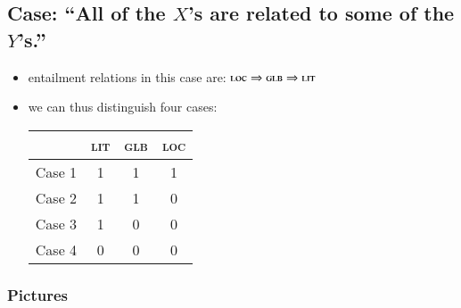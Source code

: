 \documentclass[fleqn,reqno,10pt,draft]{article}
\newcommand{\lit}{\ensuremath{\text{\textsc{lit}}}}
\newcommand{\glb}{\ensuremath{\text{\textsc{glb}}}}
\newcommand{\loc}{\ensuremath{\text{\textsc{loc}}}}
\begin{document}
\subsection{Case: ``All of the $X$'s are related to some of the $Y$'s.''}
\label{sec:case:-all-some}

\begin{itemize}
\item entailment relations in this case are: $\loc
  \Rightarrow \glb \Rightarrow \lit$
\item we can thus distinguish four cases:
  \begin{center}
    \begin{tabular}{lccc}
      \toprule
      & \textsc{lit} & \textsc{glb} & \textsc{loc} \\ \midrule
      Case 1 & 1 & 1 & 1 \\
      Case 2 & 1 & 1 & 0 \\
      Case 3 & 1 & 0 & 0 \\
      Case 4 & 0 & 0 & 0 \\ \bottomrule
    \end{tabular}
  \end{center}
\end{itemize}

\subsubsection{Pictures}
\label{sec:pictures}
\end{document}
